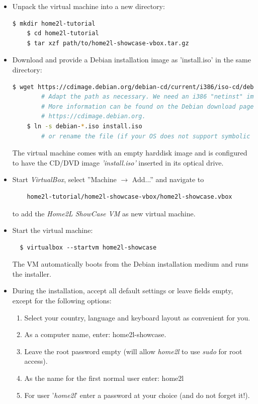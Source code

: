 \documentclass[12pt,english,parskip=half,headheight=19pt]{scrreprt}
\newcommand{\lstf}[1]{\colorbox{lstbackground}{\ttfamily\footnotesize#1}}
\begin{document}
\begin{itemize}[$\blacktriangleright$]

\item
  Unpack the virtual machine into a new directory:
  \begin{lstlisting}[language=bash]
    $ mkdir home2l-tutorial
    $ cd home2l-tutorial
    $ tar xzf path/to/home2l-showcase-vbox.tar.gz
  \end{lstlisting}

\item
  Download and provide a Debian installation image as 'install.iso' in the same directory:
  \begin{lstlisting}[language=bash]
    $ wget https://cdimage.debian.org/debian-cd/current/i386/iso-cd/debian-9.6.0-i386-netinst.iso
        # Adapt the path as necessary. We need an i386 "netinst" image.
        # More information can be found on the Debian download page at
        # https://cdimage.debian.org.
    $ ln -s debian-*.iso install.iso
        # or rename the file (if your OS does not support symbolic links)
  \end{lstlisting}

  The virtual machine comes with an empty harddisk image and is configured
  to have the CD/DVD image \textit{'install.iso'} inserted in its optical drive.

\item
  Start \textit{VirtualBox}, select ''Machine $\rightarrow$ Add...'' and navigate to
  \begin{lstlisting}
    home2l-tutorial/home2l-showcase-vbox/home2l-showcase.vbox
  \end{lstlisting}
  to add the \textit{Home2L ShowCase VM} as new virtual machine.

\item
  Start the virtual machine:
  \begin{lstlisting}
  $ virtualbox --startvm home2l-showcase
  \end{lstlisting}
  The VM automatically boots from the Debian installation medium and runs the installer.

\item
  During the installation, accept all default settings or leave fields empty,
  except for the following options:
  \begin{enumerate}
    \item Select your country, language and keyboard layout as convenient for you.
    \item As a computer name, enter: \lstf{home2l-showcase}.
    \item Leave the root password empty (will allow \textit{home2l} to use \textit{sudo} for root access).
    \item As the name for the first normal user enter: \lstf{home2l}
    \item For user '\textit{home2l}' enter a password at your choice (and do not forget it!).
  \end{enumerate}


\end{itemize}
\end{document}
